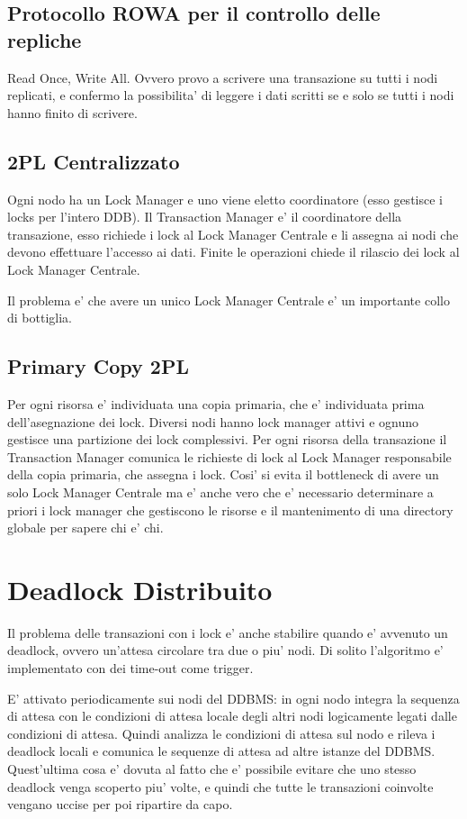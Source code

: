 \subsection{Protocollo ROWA per il controllo delle repliche}

Read Once, Write All. Ovvero provo a scrivere una transazione su tutti i nodi replicati, e confermo la possibilita' di leggere i dati scritti se e solo se tutti i nodi hanno finito di scrivere.

\subsection{2PL Centralizzato}

Ogni nodo ha un Lock Manager e uno viene eletto coordinatore (esso gestisce i locks per l'intero DDB).
Il Transaction Manager e' il coordinatore della transazione, esso richiede i lock al Lock Manager Centrale e li assegna ai nodi che devono effettuare l'accesso ai dati. Finite le operazioni chiede il rilascio dei lock al Lock Manager Centrale.

Il problema e' che avere un unico Lock Manager Centrale e' un importante collo di bottiglia.

\subsection{Primary Copy 2PL}

Per ogni risorsa e' individuata una copia primaria, che e' individuata prima dell'asegnazione dei lock. Diversi nodi hanno lock manager attivi e ognuno gestisce una partizione dei lock complessivi. Per ogni risorsa della transazione il Transaction Manager comunica le richieste di lock al Lock Manager responsabile della copia primaria, che assegna i lock.
Cosi' si evita il bottleneck di avere un solo Lock Manager Centrale ma e' anche vero che e' necessario determinare a priori i lock manager che gestiscono le risorse e il mantenimento di una directory globale per sapere chi e' chi.

\section{Deadlock Distribuito}

Il problema delle transazioni con i lock e' anche stabilire quando e' avvenuto un deadlock, ovvero un'attesa circolare tra due o piu' nodi.
Di solito l'algoritmo e' implementato con dei time-out come trigger.

E' attivato periodicamente sui nodi del DDBMS: in ogni nodo integra la sequenza di attesa con le condizioni di attesa locale degli altri nodi logicamente legati dalle condizioni di attesa. Quindi analizza le condizioni di attesa sul nodo e rileva i deadlock locali e comunica le sequenze di attesa ad altre istanze del DDBMS.
Quest'ultima cosa e' dovuta al fatto che e' possibile evitare che uno stesso deadlock venga scoperto piu' volte, e quindi che tutte le transazioni coinvolte vengano uccise per poi ripartire da capo.

